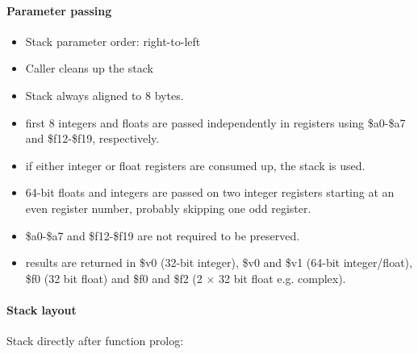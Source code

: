 \paragraph{Parameter passing}

\begin{itemize}
\item Stack parameter order: right-to-left
\item Caller cleans up the stack
\item Stack always aligned to 8 bytes.
\item first 8 integers and floats are passed independently in registers using \$a0-\$a7 and \$f12-\$f19, respectively.
\item if either integer or float registers are consumed up, the stack is used.
\item 64-bit floats and integers are passed on two integer registers starting at an even register number, probably skipping one odd register.
\item \$a0-\$a7 and \$f12-\$f19 are not required to be preserved.
\item results are returned in \$v0 (32-bit integer), \$v0 and \$v1 (64-bit integer/float), \$f0 (32 bit float) and \$f0 and \$f2 (2 $\times$ 32 bit float e.g. complex).
\end{itemize}

\paragraph{Stack layout}

Stack directly after function prolog:\\

